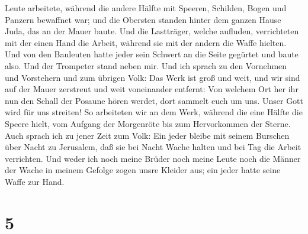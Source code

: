 Leute arbeitete, während die andere Hälfte mit Speeren, Schilden, Bogen
und Panzern bewaffnet war; und die Obersten standen hinter dem ganzen
Hause Juda, das an der Mauer baute. Und die Lastträger, welche aufluden,
 verrichteten mit der einen Hand die Arbeit, während sie
mit der andern die Waffe hielten.  Und von den Bauleuten
hatte jeder sein Schwert an die Seite gegürtet und baute also. Und der
Trompeter stand neben mir.  Und ich sprach zu den
Vornehmen und Vorstehern und zum übrigen Volk: Das Werk ist groß und
weit, und wir sind auf der Mauer zerstreut und weit voneinander
entfernt:  Von welchem Ort her ihr nun den Schall der
Posaune hören werdet, dort sammelt euch um uns. Unser Gott wird für uns
streiten!  So arbeiteten wir an dem Werk, während die
eine Hälfte die Speere hielt, vom Aufgang der Morgenröte bis zum
Hervorkommen der Sterne.  Auch sprach ich zu jener Zeit
zum Volk: Ein jeder bleibe mit seinem Burschen über Nacht zu Jerusalem,
daß sie bei Nacht Wache halten und bei Tag die Arbeit verrichten.
 Und weder ich noch meine Brüder noch meine Leute noch
die Männer der Wache in meinem Gefolge zogen unsre Kleider aus; ein
jeder hatte seine Waffe zur Hand.

\hypertarget{section-4}{%
\section{5}\label{section-4}}

